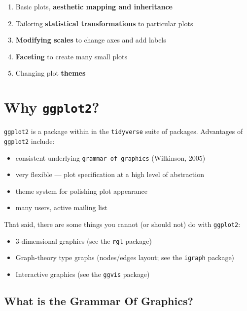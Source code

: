 \documentclass[]{book}
\providecommand{\tightlist}{%
  \setlength{\itemsep}{0pt}\setlength{\parskip}{0pt}}
\begin{document}
\begin{enumerate}
\def\labelenumi{\arabic{enumi}.}
\tightlist
\item
  Basic plots, \textbf{aesthetic mapping and inheritance}
\item
  Tailoring \textbf{statistical transformations} to particular plots
\item
  \textbf{Modifying scales} to change axes and add labels
\item
  \textbf{Faceting} to create many small plots
\item
  Changing plot \textbf{themes}
\end{enumerate}

\hypertarget{why-ggplot2}{%
\section{\texorpdfstring{Why \texttt{ggplot2}?}{Why ggplot2?}}\label{why-ggplot2}}

\texttt{ggplot2} is a package within in the \texttt{tidyverse} suite of packages. Advantages of \texttt{ggplot2} include:

\begin{itemize}
\tightlist
\item
  consistent underlying \texttt{grammar\ of\ graphics} (Wilkinson, 2005)
\item
  very flexible --- plot specification at a high level of abstraction
\item
  theme system for polishing plot appearance
\item
  many users, active mailing list
\end{itemize}

That said, there are some things you cannot (or should not) do with \texttt{ggplot2}:

\begin{itemize}
\tightlist
\item
  3-dimensional graphics (see the \texttt{rgl} package)
\item
  Graph-theory type graphs (nodes/edges layout; see the \texttt{igraph} package)
\item
  Interactive graphics (see the \texttt{ggvis} package)
\end{itemize}

\hypertarget{what-is-the-grammar-of-graphics}{%
\subsection{What is the Grammar Of Graphics?}\label{what-is-the-grammar-of-graphics}}
\end{document}
